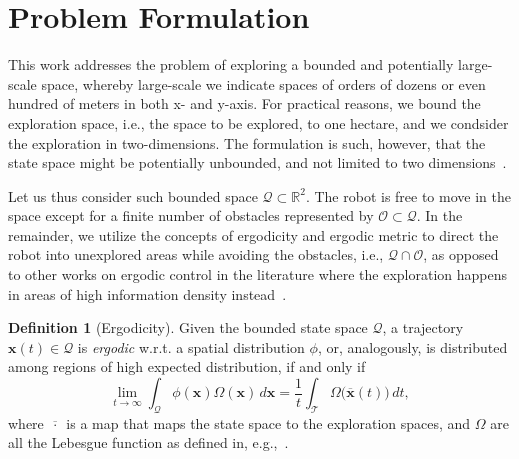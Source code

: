 \documentclass[letterpaper,10pt,conference,twoside]{IEEEtran}
\theoremstyle{definition}
\newtheorem{defn}{Definition}[section]
\begin{document}
\section{Problem Formulation}\label{sec:pb}
\noindent
This work addresses the problem of exploring a bounded and potentially large-scale space, whereby large-scale we indicate spaces of orders of dozens or even hundred of meters in both x- and y-axis. For practical reasons, we bound the exploration space, i.e., the space to be explored, to one hectare, and we condsider the exploration in two-dimensions. The formulation is such, however, that the state space might be potentially unbounded, and not limited to two dimensions~\cite{dong2023time}.

Let us thus consider such bounded space $\mathcal{Q}\subset\mathbb{R}^2$. The robot is free to move in the space except for a finite number of obstacles represented by $\mathcal{O}\subset\mathcal{Q}$.  
In the remainder, we utilize the concepts of ergodicity and ergodic metric to direct the robot into unexplored areas while avoiding the obstacles, i.e., $\mathcal{Q}\cap\mathcal{O}$, as opposed to other works on ergodic control in the literature where the exploration happens in areas of high information density instead~\cite{mathew2011metrics,abraham2017ergodic,miller2013trajectory}.
\begin{defn}[Ergodicity]
  Given the bounded state space $\mathcal{Q}$, a trajectory $\mathbf{x}(t)\in\mathcal{Q}$ is \textit{ergodic} w.r.t. a spatial distribution $\phi$, or, analogously, is distributed among regions of high expected distribution, if and only if
  \begin{equation}
    \lim_{t\rightarrow\infty}{\int_{\mathcal{Q}}\phi(\mathbf{x})\Omega(\mathbf{x})\,d\mathbf{x}=\frac{1}{t}\int_{\mathcal{T}}{{\Omega\big(\overline{\mathbf{x}}(t)\big)}}\,dt},
  \end{equation}
  where $\overline{\,\cdot\,}$ is a map that maps the state space to the exploration spaces, and $\Omega$ are all the Lebesgue function as defined in, e.g.,~\cite{TODO}.
\end{defn}
\end{document}
